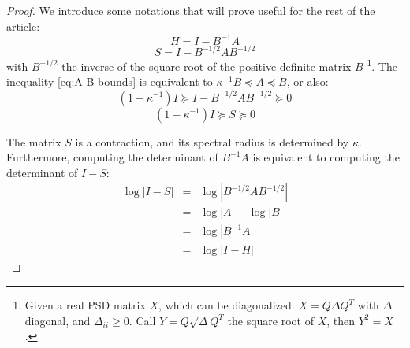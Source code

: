 \begin{proof} We introduce some notations that will prove useful
for the rest of the article: 
\[
H=I-B^{-1}A
\]
\[
S=I-B^{-1/2}AB^{-1/2}
\]
with $B^{-1/2}$ the inverse of the square root of the positive-definite
matrix $B$%
\footnote{Given a real PSD matrix $X$, which can be diagonalized: $X=Q\Delta Q^{T}$
with $\Delta$ diagonal, and $\Delta_{ii}\geq0$. Call $Y=Q\sqrt{\Delta}Q^{T}$
the square root of $X$, then $Y^{2}=X$.%
}. The inequality \ref{eq:A-B-bounds} is equivalent to $\kappa^{-1}B\preceq A\preceq B$,
or also: 
\[
\left(1-\kappa^{-1}\right)I\succeq I-B^{-1/2}AB^{-1/2}\succeq0
\]
\[
\left(1-\kappa^{-1}\right)I\succeq S\succeq0
\]


The matrix $S$ is a contraction, and its spectral radius is determined
by $\kappa$. Furthermore, computing the determinant of $B^{-1}A$
is equivalent to computing the determinant of $I-S$: 
\begin{eqnarray*}
\log\left|I-S\right| & = & \log\left|B^{-1/2}AB^{-1/2}\right|\\
 & = & \log\left|A\right|-\log\left|B\right|\\
 & = & \log\left|B^{-1}A\right|\\
 & = & \log\left|I-H\right|
\end{eqnarray*}



\end{proof}
